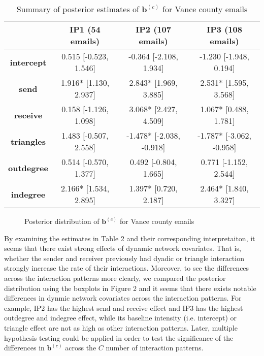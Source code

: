 \documentclass[a4paper]{article}
\begin{document}
 \begin{table}[ht]
 	\centering
 	\begin{tabular}{|c|c|c|c|} 
 		\hline
 		& \textbf{IP1} (54 emails) & \textbf{IP2} (107 emails) &\textbf{IP3} (108 emails) \\
 		\hline
 		\textbf{intercept} & 0.515 [-0.523, 1.546]& -0.364 [-2.108, 1.934]& -1.230 [-1.948, 0.194]\\
 		\textbf{send}&  1.916* [1.130, 2.937]& 2.843* [1.969, 3.885]& 2.531* [1.595, 3.568]\\
 		\textbf{receive}& 0.158 [-1.126, 1.098]& 3.068* [2.427, 4.509]& 1.067* [0.488, 1.781]\\
 		\textbf{triangles} & 1.483 [-0.507, 2.558]& -1.478* [-2.038, -0.918]& -1.787* [-3.062, -0.958]\\
 		\textbf{outdegree} & 0.514 [-0.570, 1.377]& 0.492 [-0.804, 1.665]& 0.771 [-1.152, 2.544]\\
 		\textbf{indegree} & 2.166* [1.534, 2.895]& 1.397* [0.720, 2.187]& 2.464* [1.840, 3.327]\\
 		\hline
 	\end{tabular}
 	\caption {Summary of posterior estimates of $\boldsymbol{b}^{(c)}$ for Vance county emails}
 	\label{table:Vancebeta}
 \end{table}
 \begin{figure}[ht]
 	\centering
 	\caption{Posterior distribution of  $\boldsymbol{b}^{(c)}$ for Vance county emails}
 	\label{fig:Vanceboxplot}
 \end{figure}
 By examining the estimates in Table 2 and their corresponding interpretaiton, it seems that there exist strong effects of dynamic network covariates. That is, whether the sender and receiver previously had dyadic or triangle interaction strongly increase the rate of their interactions. Moreover, to see the differences across the interaction patterns more clearly, we compared the posterior distribution using the boxplots in Figure 2 and it seems that there exists notable differences in dynmic network covariates across the interaction patterns. For example, IP2 has the highest send and receive effect and IP3 has the highest outdegree and indegree effect, while its baseline intensity (i.e. intercept) or triangle effect are not as high as other interaction patterns. Later, multiple hypothesis testing could be applied in order to test the significance of the differences in  $\boldsymbol{b}^{(c)}$ across the $C$ number of interaction patterns.\\\newline
\end{document}
